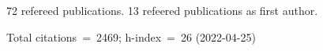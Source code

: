 72 refereed publications. 13 refeered publications as first author.

Total citations~=~2469; h-index~=~26 (2022-04-25)
